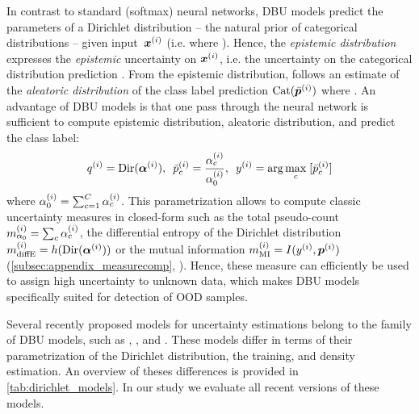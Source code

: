 In contrast to standard (softmax) neural networks, DBU models predict the parameters of a Dirichlet distribution -- the natural prior of categorical distributions -- given input~${\bm{x}} ^{(i)}$ (i.e.  where ). Hence, the \emph{epistemic distribution}  expresses the \emph{epistemic} uncertainty on ${\bm{x}} ^{(i)}$, i.e. the uncertainty on the categorical distribution prediction \smash{$\vp\dataix$}. From the epistemic distribution, follows an estimate of the \emph{aleatoric distribution} of the class label prediction $\text{Cat}(\bar{{\bm{p}}}^{(i)})$ where .
An advantage of DBU models is that one pass through the neural network is sufficient to compute epistemic distribution, aleatoric distribution, and predict the class label:
%
\begin{equation}
\begin{aligned}
    q^{(i)}           = \text{Dir}(\bm{\alpha}^{(i)}), \hspace{5pt}
    \bar{p}_c^{(i)}  = \frac{\alpha_c^{(i)}}{\alpha_0^{(i)}}, \hspace{5pt}
    y^{(i)}           = \arg \max_{c} \;[\bar{p}_c^{(i)}]
\end{aligned}
\end{equation}
%
where $\alpha_0^{(i)} = \sum^{C}_{c=1} \alpha_c^{(i)}$. This parametrization allows to compute classic uncertainty measures in closed-form such as the total pseudo-count $m^{(i)}_{\alpha_0} = \sum_c \alpha^{(i)}_c$, the differential entropy of the Dirichlet distribution $m^{(i)}_\text{diffE} = h(\text{Dir}(\bm{\alpha}^{(i)}))$ or the mutual information $m^{(i)}_\text{MI} = I(y^{(i)}, {\bm{p}}^{(i)})$ (\cref{subsec:appendix_measurecomp}, \citep{malini2018}). 
Hence, these measure can efficiently be used to assign high uncertainty to unknown data, which makes DBU models specifically suited for detection of OOD samples. 





Several recently proposed models for uncertainty estimations belong to the family of DBU models, such as \PriorNet, \EvNet, \DDNet and \PostNet. These models differ in terms of their parametrization of the Dirichlet distribution, the training, and density estimation. An overview of theses differences is provided in \cref{tab:dirichlet_models}. In our study we evaluate all recent versions of these models.


